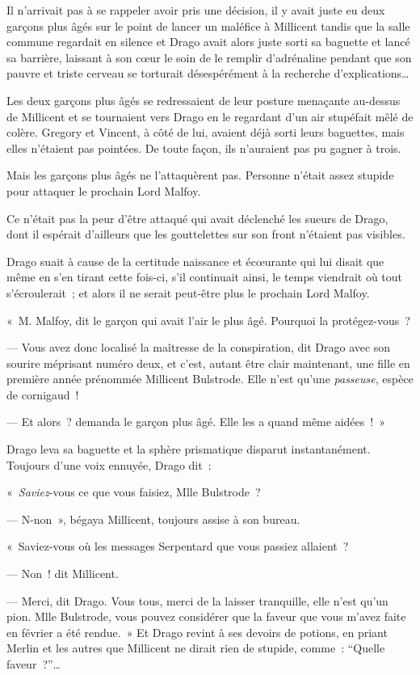 Il n'arrivait pas à se rappeler avoir pris une décision, il y avait juste eu deux garçons plus âgés sur le point de lancer un maléfice à Millicent tandis que la salle commune regardait en silence et Drago avait alors juste sorti sa baguette et lancé sa barrière, laissant à son cœur le soin de le remplir d'adrénaline pendant que son pauvre et triste cerveau se torturait désespérément à la recherche d'explications…

Les deux garçons plus âgés se redressaient de leur posture menaçante au-dessus de Millicent et se tournaient vers Drago en le regardant d'un air stupéfait mêlé de colère.
Gregory et Vincent, à côté de lui, avaient déjà sorti leurs baguettes, mais elles n'étaient pas pointées.
De toute façon, ils n'auraient pas pu gagner à trois.

Mais les garçons plus âgés ne l'attaquèrent pas.
Personne n'était assez stupide pour attaquer le prochain Lord Malfoy.

Ce n'était pas la peur d'être attaqué qui avait déclenché les sueurs de Drago, dont il espérait d'ailleurs que les gouttelettes sur son front n'étaient pas visibles.

Drago suait à cause de la certitude naissance et écœurante qui lui disait que même en s'en tirant cette fois-ci, s'il continuait ainsi, le temps viendrait où tout s'écroulerait~; et alors il ne serait peut-être plus le prochain Lord Malfoy.

«~M. Malfoy, dit le garçon qui avait l'air le plus âgé.
Pourquoi la protégez-vous~?

--- Vous avez donc localisé la maîtresse de la conspiration, dit Drago avec son sourire méprisant numéro deux, et c'est, autant être clair maintenant, une fille en première année prénommée Millicent Bulstrode.
Elle n'est qu'une \emph{passeuse}, espèce de cornigaud~!

--- Et alors~? demanda le garçon plus âgé.
Elle les a quand même aidées~!~»

Drago leva sa baguette et la sphère prismatique disparut instantanément.
Toujours d'une voix ennuyée, Drago dit~:

«~\emph{Saviez}-vous ce que vous faisiez, Mlle Bulstrode~?

--- N-non~», bégaya Millicent, toujours assise à son bureau.

«~Saviez-vous où les messages Serpentard que vous passiez allaient~?

--- Non~! dit Millicent.

--- Merci, dit Drago.
Vous tous, merci de la laisser tranquille, elle n'est qu'un pion.
Mlle Bulstrode, vous pouvez considérer que la faveur que vous m'avez faite en février a été rendue.~»
Et Drago revint à ses devoirs de potions, en priant Merlin et les autres que Millicent ne dirait rien de stupide, comme~: “Quelle faveur~?”…

